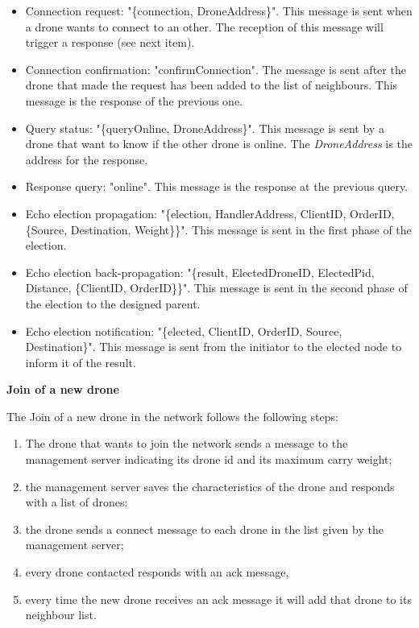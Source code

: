 \documentclass[a4paper, oneside]{memoir}
\begin{document}
\begin{itemize}
	\item Connection request: "\{connection, DroneAddress\}".
	This message is sent when a drone wants to connect to an other. The reception of this message will trigger a response (see next item).

	\item Connection confirmation: "confirmConnection".
	The message is sent after the drone that made the request has been added to the list of neighbours. This message is the response of the previous one.

	\item Query status: "\{queryOnline, DroneAddress\}".
	This message is sent by a drone that want to know if the other drone is online. The \textit{DroneAddress} is the address for the response.

	\item Response query: "online".
	This message is the response at the previous query.

	\item Echo election propagation: "\{election, HandlerAddress, ClientID, OrderID, \{Source, Destination, Weight\}\}".
	This message is sent in the first phase of the election.

	\item Echo election back-propagation: "\{result, ElectedDroneID, ElectedPid, Distance, \{ClientID, OrderID\}\}".
	This message is sent in the second phase of the election to the designed parent.

	\item Echo election notification: "\{elected, ClientID, OrderID, Source, Destination\}".
	This message is sent from the initiator to the elected node to inform it of the result.
\end{itemize}
\newpage


\textbf{Join of a new drone}

The Join of a new drone in the network follows the following steps:
\begin{enumerate}
\item  The drone that wants to join the network sends a message to the management server indicating its drone id and its maximum carry weight;
\item the management server saves the characteristics of the drone and responds with a list of drones;
\item the drone sends a connect message to each drone in the list given by the management server;
\item every drone contacted responds with an ack message,
\item every time the new drone receives an ack message it will add that drone to its neighbour list.
\end{enumerate}
\end{document}
